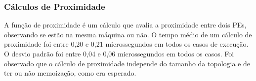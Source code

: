 

\subsubsection{Cálculos de Proximidade}

A função de proximidade é um cálculo que avalia a proximidade entre dois PEs, observando se estão na mesma máquina ou não.
O tempo médio de um cálculo de proximidade foi entre 0,20 e 0,21 microssegundos em todos os casos de execução. 
O desvio padrão foi entre 0,04  e 0,06 microssegundos em todos os casos.
Foi observado que o cálculo de proximidade independe do tamanho da topologia e de ter ou não memoização, como era esperado.

